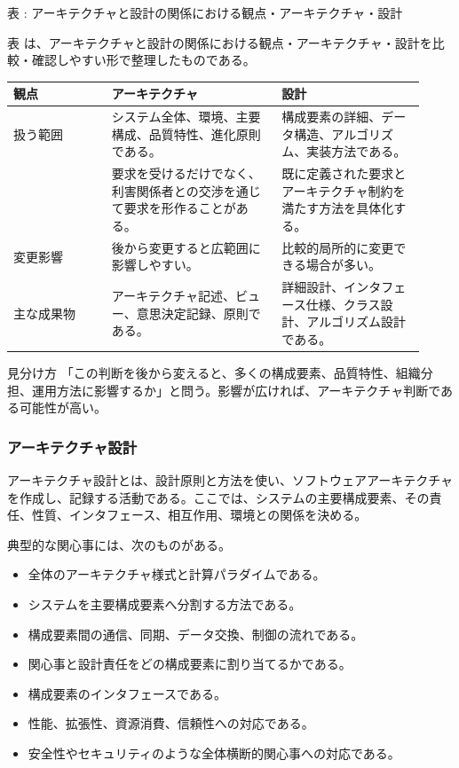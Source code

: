 \par\smallskip\noindent{}\label{tab:ch02-05}表 \thetable: アーキテクチャと設計の関係における観点・アーキテクチャ・設計\par\smallskip
表 \thetable は、アーキテクチャと設計の関係における観点・アーキテクチャ・設計を比較・確認しやすい形で整理したものである。\par\smallskip
\begin{longtable}{P{0.22\linewidth}P{0.38\linewidth}P{0.32\linewidth}}
\toprule
観点 & アーキテクチャ & 設計 \\
\midrule
扱う範囲 & システム全体、環境、主要構成、品質特性、進化原則である。 & 構成要素の詳細、データ構造、アルゴリズム、実装方法である。 \\
 & 要求を受けるだけでなく、利害関係者との交渉を通じて要求を形作ることがある。 & 既に定義された要求とアーキテクチャ制約を満たす方法を具体化する。 \\
変更影響 & 後から変更すると広範囲に影響しやすい。 & 比較的局所的に変更できる場合が多い。 \\
主な成果物 & アーキテクチャ記述、ビュー、意思決定記録、原則である。 & 詳細設計、インタフェース仕様、クラス設計、アルゴリズム設計である。 \\
\bottomrule
\end{longtable}

\begin{statementbox}{見分け方}
「この判断を後から変えると、多くの構成要素、品質特性、組織分担、運用方法に影響するか」と問う。影響が広ければ、アーキテクチャ判断である可能性が高い。
\end{statementbox}

\subsubsection{アーキテクチャ設計}
アーキテクチャ設計とは、設計原則と方法を使い、ソフトウェアアーキテクチャを作成し、記録する活動である。ここでは、システムの主要構成要素、その責任、性質、インタフェース、相互作用、環境との関係を決める。

典型的な関心事には、次のものがある。
\begin{itemize}
  \item 全体のアーキテクチャ様式と計算パラダイムである。
  \item システムを主要構成要素へ分割する方法である。
  \item 構成要素間の通信、同期、データ交換、制御の流れである。
  \item 関心事と設計責任をどの構成要素に割り当てるかである。
  \item 構成要素のインタフェースである。
  \item 性能、拡張性、資源消費、信頼性への対応である。
  \item 安全性やセキュリティのような全体横断的関心事への対応である。
\end{itemize}

